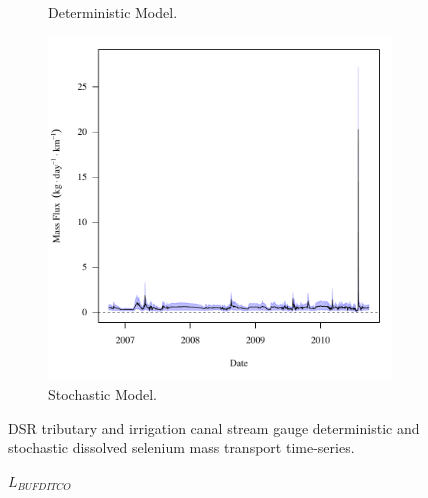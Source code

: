 \begin{linenumbers}
\begin{landscape}
\begin{figure}
\begin{subfigure}{0.7\textwidth}
			\caption{Deterministic Model.}
		\end{subfigure}%
		\begin{subfigure}{0.7\textwidth}
			\centering
			\includegraphics[width=\tableCustomSize]{"Figures/Results_DSR/Stochastic/f BIG"}
			\caption{Stochastic Model.}
		\end{subfigure}
		\caption{DSR tributary and irrigation canal stream gauge deterministic and stochastic dissolved selenium mass transport time-series.}
	\end{figure}
\end{landscape}
\subfiguremid
\begin{landscape}
	\begin{figure}
		$ \displaystyle L_{BUFDITCO} $
		\begin{subfigure}{0.7\textwidth}
			\centering

\end{subfigure}
\end{figure}
\end{landscape}
\end{linenumbers}
